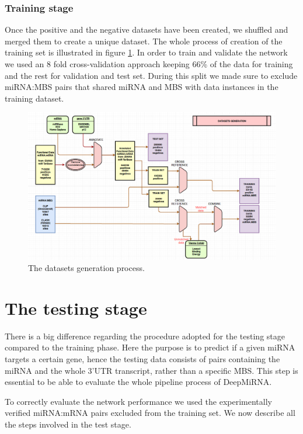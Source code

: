 \subsubsection{Training stage}
Once the positive and the negative datasets have been created, we shuffled and merged them to create a unique dataset. The whole process of creation of the training set is illustrated in figure \ref{fig:training}. In order to train and validate the network we used an 8 fold cross-validation approach keeping 66\% of the data for training and the rest for validation and test set. During this split we made sure to exclude miRNA:MBS pairs that shared miRNA and MBS with data instances in the training dataset.

\begin{figure}[hbt!]
	\centering
	\includegraphics[width=1\textwidth]{Figures/training}
	\caption{The datasets generation process.}
	\label{fig:training}
\end{figure}

\section{The testing stage}
There is a big difference regarding the procedure adopted for the testing stage compared to the training phase. Here the purpose is to predict if a given miRNA targets a certain gene, hence the testing data consists of pairs containing the miRNA and the whole 3'UTR transcript, rather than a specific MBS. This step is essential to be able to evaluate the whole pipeline process of DeepMiRNA.


To correctly evaluate the network performance we used the experimentally verified miRNA:mRNA pairs excluded from the training set. We now describe all the steps involved in the test stage. 

